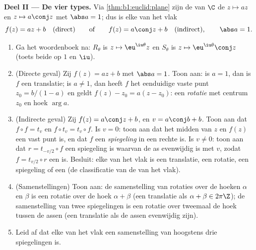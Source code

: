 \begin{problem}
\medskip
\noindent\textbf{Deel II --- De vier types.} Via
\cref{thm:b1:euclid:plane} zijn de   van $\C$
de  $z \mapsto az$ en $z \mapsto a\conj z$ met $\abs a
= 1$; dus is elke  van het vlak
\[
f(z) = a z + b \quad (\text{direct}) \qquad\text{of}\qquad
f(z) = a\conj z + b \quad (\text{indirect}), \qquad \abs a = 1 .
\]
\begin{enumerate}[resume]
  \item Ga het woordenboek na: $R_\theta$ is $z \mapsto
        \eu^{\iu\theta}z$ en $S_\theta$ is $z \mapsto
        \eu^{\iu\theta}\conj z$ (toets beide op $1$ en $\iu$).
  \item (Directe geval) Zij $f(z) = az + b$ met $\abs a = 1$. Toon
        aan: is $a = 1$, dan is $f$ een translatie; is $a \neq 1$,
        dan heeft $f$ het eenduidige vaste punt $z_0 = b/(1 - a)$
        en geldt $f(z) - z_0 = a(z - z_0)$: een \emph{rotatie} met
        centrum $z_0$ en hoek $\arg a$.
  \item (Indirecte geval) Zij $f(z) = a\conj z + b$, en $v =
        a\conj b + b$. Toon aan dat $f \circ f = t_v$ en $f \circ
        t_v = t_v \circ f$. Is $v = 0$: toon aan dat het midden
        van $z$ en $f(z)$ een vast punt is, en dat $f$ een
        \emph{spiegeling} in een rechte is. Is $v \neq 0$: toon aan
        dat $r = t_{-v/2}\circ f$ een spiegeling is waarvan de as
        evenwijdig is met $v$, zodat $f = t_{v/2} \circ r$ een
        \emph{} is. Besluit: elke  van het
        vlak is een translatie, een rotatie, een spiegeling of een
         (de classificatie van de  van het
        vlak).
  \item (Samenstellingen) Toon aan: de samenstelling van rotaties
        over de hoeken $\alpha$ en $\beta$ is een rotatie over de
        hoek $\alpha + \beta$ (een translatie als $\alpha + \beta
        \in 2\pi\Z$); de samenstelling van twee spiegelingen is een
        rotatie over tweemaal de hoek tussen de assen (een
        translatie als de assen evenwijdig zijn).
  \item Leid af dat elke  van het vlak een samenstelling
        van hoogstens drie spiegelingen is.
\end{enumerate}


\end{problem}
